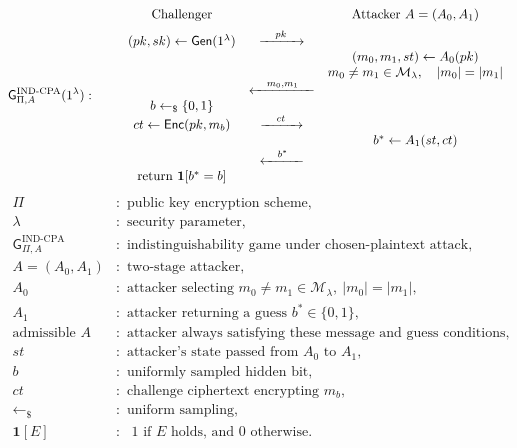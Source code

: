 \documentclass[12pt,a4paper]{article}
\begin{document}
\begin{samepage}
\begin{definition}
\[
\mathsf{G}^{\mathrm{IND\text{-}CPA}}_{\Pi,A}(1^\lambda):
\qquad
\begin{array}{c@{\quad}c@{\quad}c}
\text{Challenger}& &\text{Attacker }A=(A_0,A_1)\\[5pt]
(pk,sk)\leftarrow\mathsf{Gen}(1^\lambda)
&\xrightarrow{\quad pk\quad}&\\
&& (m_0,m_1,st)\leftarrow A_0(pk)\\
&&m_0\ne m_1\in\mathcal{M}_\lambda,\quad |m_0|=|m_1|\\
&\xleftarrow{\quad m_0,m_1\quad}&\\
b\leftarrow_{\$}\{0,1\}&&\\
ct\leftarrow\mathsf{Enc}(pk,m_b)
&\xrightarrow{\quad ct\quad}&\\
&&b^*\leftarrow A_1(st,ct)\\
&\xleftarrow{\quad b^*\quad}&\\
\mathrm{return}\ \mathbf{1}[b^*=b]&&
\end{array}
\]
\[
\begin{aligned}
\Pi&:\text{ public key encryption scheme},\\
\lambda&:\text{ security parameter},\\
\mathsf{G}^{\mathrm{IND\text{-}CPA}}_{\Pi,A}&:\text{ indistinguishability game under chosen-plaintext attack},\\
A=(A_0,A_1)&:\text{ two-stage attacker},\\
A_0&:\text{ attacker selecting }m_0\ne m_1\in\mathcal{M}_\lambda,
\ |m_0|=|m_1|,\\
A_1&:\text{ attacker returning a guess }b^*\in\{0,1\},\\
\text{admissible }A&:\text{ attacker always satisfying these message and guess conditions},\\
st&:\text{ attacker's state passed from }A_0\text{ to }A_1,\\
b&:\text{ uniformly sampled hidden bit},\\
ct&:\text{ challenge ciphertext encrypting }m_b,\\
\leftarrow_{\$}&:\text{ uniform sampling},\\
\mathbf{1}[E]&:\text{ }1\text{ if }E\text{ holds, and }0\text{ otherwise}.
\end{aligned}
\]
\end{definition}
\end{samepage}
\end{document}
